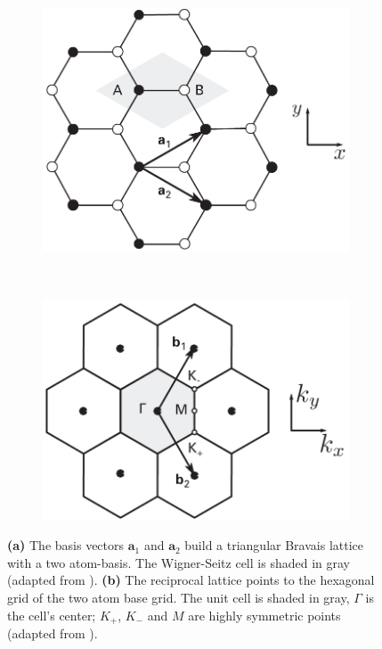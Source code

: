 \begin{figure}[!h]
  \centering
  \begin{subfigure}{0.45\textwidth}
    \includegraphics[width=\textwidth]{./images/cell.png}
  \end{subfigure}
  ~
  \begin{subfigure}{0.45\textwidth}
    \includegraphics[width=\textwidth]{./images/k-cell.png}
  \end{subfigure}
  \caption{\textbf{(a)} The basis vectors $\mathbf{a}_1$ and $\mathbf{a}_2$ build a triangular Bravais lattice with a two atom-basis. The Wigner-Seitz cell is shaded in gray (adapted from \mcite). \textbf{(b)} The reciprocal lattice points to the hexagonal grid of the two atom base grid. The unit cell is shaded in gray, $\Gamma$ is the cell's center; $K_+$, $K_-$ and $M$ are highly symmetric points (adapted from \mcite).}
\end{figure}

